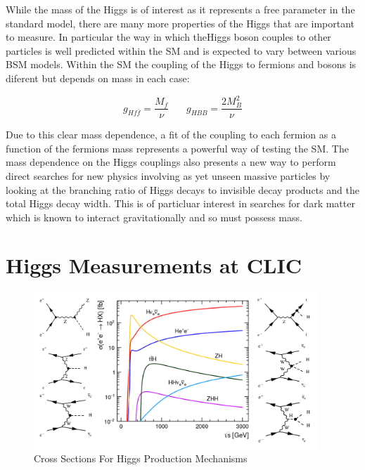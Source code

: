 While the mass of the Higgs is of interest as it represents a free parameter in the standard model, there are many more properties of the Higgs that are important to measure. In particular the way in which theHiggs boson couples to other particles is well predicted within the \ac{SM} and is expected to vary between various \ac{BSM} models. Within the \ac{SM} the coupling of the Higgs to fermions and bosons is diferent but depends on mass in each case:


\begin{equation}
g_{Hf\bar{f}}=\frac{M_f}{\nu} ~~~~~~~~    g_{HBB}=\frac{2M_B^2}{\nu} 
\end{equation}

Due to this clear mass dependence, a fit of the coupling to each fermion as a function of the fermions mass represents a powerful way of testing the \ac{SM}. The mass dependence on the Higgs couplings also presents a new way to perform direct searches for new physics involving as yet unseen massive particles by looking at the branching ratio of Higgs decays to invisible decay products and the total Higgs decay width. This is of particluar interest in searches for dark matter which is known to interact gravitationally and so must possess mass. 

\section{Higgs Measurements at CLIC}
\begin{figure}
  \centering
  \includegraphics[width=0.95\textwidth,keepaspectratio]{Theory/fig/HiggsProcessesExtra.png}
  \caption[Cross Sections For Higgs Production Mechanisms]{Cross Sections For Higgs Production Mechanisms}
  \label{fig:higgsXSecs}
\end{figure}

